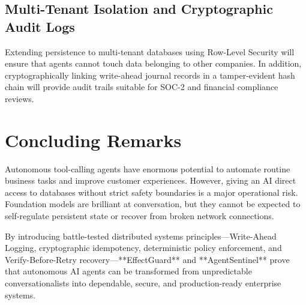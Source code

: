 \subsection{Multi-Tenant Isolation and Cryptographic Audit Logs}
Extending persistence to multi-tenant databases using Row-Level Security will ensure that agents cannot touch data belonging to other companies. In addition, cryptographically linking write-ahead journal records in a tamper-evident hash chain will provide audit trails suitable for SOC-2 and financial compliance reviews.

\section{Concluding Remarks}

Autonomous tool-calling agents have enormous potential to automate routine business tasks and improve customer experiences. However, giving an AI direct access to databases without strict safety boundaries is a major operational risk. Foundation models are brilliant at conversation, but they cannot be expected to self-regulate persistent state or recover from broken network connections.

By introducing battle-tested distributed systems principles---Write-Ahead Logging, cryptographic idempotency, deterministic policy enforcement, and Verify-Before-Retry recovery---**EffectGuard** and **AgentSentinel** prove that autonomous AI agents can be transformed from unpredictable conversationalists into dependable, secure, and production-ready enterprise systems.
